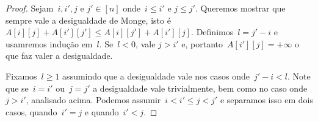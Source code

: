\begin{proof}
Sejam~$i,i',j$ e $j' \in [n]$ onde~$i \leq i'$ e $j \leq j'$. Queremos mostrar que sempre vale a desigualdade de Monge, isto é~${A[i][j] + A[i'][j'] \leq A[i][j'] + A[i'][j]}$. Definimos~$l = j' - i$ e usamremos indução em~$l$. Se~${l < 0}$, vale ${j > i'}$ e, portanto~${A[i'][j] = +\infty}$ o que faz valer a desigualdade.

Fixamos~$l \geq 1$ assumindo que a desigualdade vale nos casos onde~${j' - i < l}$. Note que se~${i = i'}$ ou~${j = j'}$ a desigualdade vale trivialmente, bem como no caso onde~${j > i'}$, analisado acima. Podemos assumir~$i < i' \leq j < j'$ e separamos isso em dois casos, quando~$i' = j$ e quando~$i' < j$.

\end{proof}
